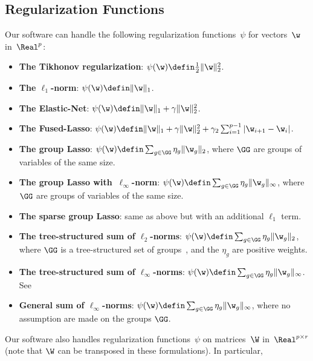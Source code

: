\documentclass[a4paper, 11pt]{article}
\begin{document}
\subsection{Regularization Functions}
Our software can handle the following regularization functions~$\psi$ for vectors~$\w$ in~$\Real^p$:
\begin{itemize}
   \item \textbf{The Tikhonov regularization}: $\psi(\w) \defin \frac{1}{2}\|\w\|_2^2$.
   \item \textbf{The $\ell_1$-norm}: $\psi(\w) \defin \|\w\|_1$.
   \item \textbf{The Elastic-Net}: $\psi(\w) \defin \|\w\|_1+\gamma\|\w\|_2^2$.
   \item \textbf{The Fused-Lasso}: $\psi(\w) \defin \|\w\|_1+\gamma\|\w\|_2^2+\gamma_2\sum_{i=1}^{p-1}|\w_{i+1}-\w_i|$.
   \item \textbf{The group Lasso}: $\psi(\w) \defin \sum_{g \in \GG} \eta_g \|\w_g\|_2$, where $\GG$ are groups of variables of the same size.
   \item \textbf{The group Lasso with~$\ell_\infty$-norm}: $\psi(\w) \defin \sum_{g \in \GG} \eta_g \|\w_g\|_\infty$, where $\GG$ are groups of variables of the same size.
   \item \textbf{The sparse group Lasso}: same as above but with an additional $\ell_1$ term.
   \item \textbf{The tree-structured sum of $\ell_2$-norms}: $\psi(\w) \defin \sum_{g \in \GG} \eta_g \|\w_g\|_2$, where $\GG$ is a tree-structured set of groups~\cite{jenatton3}, and the $\eta_g$ are positive weights.
   \item \textbf{The tree-structured sum of $\ell_\infty$-norms}: $\psi(\w) \defin \sum_{g \in \GG} \eta_g \|\w_g\|_\infty$. See \cite{jenatton3}
   \item \textbf{General sum of $\ell_\infty$-norms}:  $\psi(\w) \defin \sum_{g \in \GG} \eta_g \|\w_g\|_\infty$, where no assumption are made on the groups $\GG$.
\end{itemize}
Our software also handles regularization functions~$\psi$ on matrices~$\W$ in~$\Real^{p \times r}$ (note that $\W$ can be transposed in these formulations). In particular,
\end{document}
